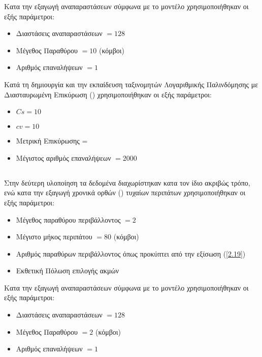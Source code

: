 Κατα την εξαγωγή αναπαραστάσεων σύμφωνα με το μοντέλο  χρησιμοποιήθηκαν οι εξής
παράμετροι:

\begin{itemize}
    \item Διαστάσεις αναπαραστάσεων \(= 128\)
    \item Μέγεθος Παραθύρου \(= 10\) (κόμβοι)
    \item Αριθμός επαναλήψεων \(= 1\)
\end{itemize}

Κατά τη δημιουργία και την εκπαίδευση ταξινομητών Λογαριθμικής Παλινδόμησης με Διασταυρωμένη
Επικύρωση () \cite{scikit-learn} χρησιμοποιήθηκαν
οι εξής παράμετροι:

\begin{itemize}
    \item \(Cs = 10\)
    \item \(cv = 10\)
    \item Μετρική Επικύρωσης = 
    \item Μέγιστος αριθμός επαναλήψεων \(= 2000\)
\end{itemize}

\subsection{}

Στην δεύτερη υλοποίηση τα δεδομένα διαχωρίστηκαν κατα τον ίδιο ακριβώς τρόπο, ενώ κατα την εξαγωγή
χρονικά ορθών () τυχαίων περιπάτων χρησιμοποιήθηκαν οι εξής παράμετροι:

\begin{itemize}
    \item Μέγεθος παραθύρου περιβάλλοντος \(= 2\)
    \item Μέγιστο μήκος περιπάτου \(= 80\) (κόμβοι)
    \item Αριθμός παραθύρων περιβάλλοντος όπως προκύπτει από την εξίσωση (\ref{2.19})
    \item Εκθετική Πόλωση επιλογής ακμών
\end{itemize}

Κατα την εξαγωγή αναπαραστάσεων σύμφωνα με το μοντέλο  χρησιμοποιήθηκαν οι εξής
παράμετροι:

\begin{itemize}
    \item Διαστάσεις αναπαραστάσεων \(= 128\)
    \item Μέγεθος Παραθύρου \(= 2\) (κόμβοι)
    \item Αριθμός επαναλήψεων \(= 1\)
\end{itemize}

